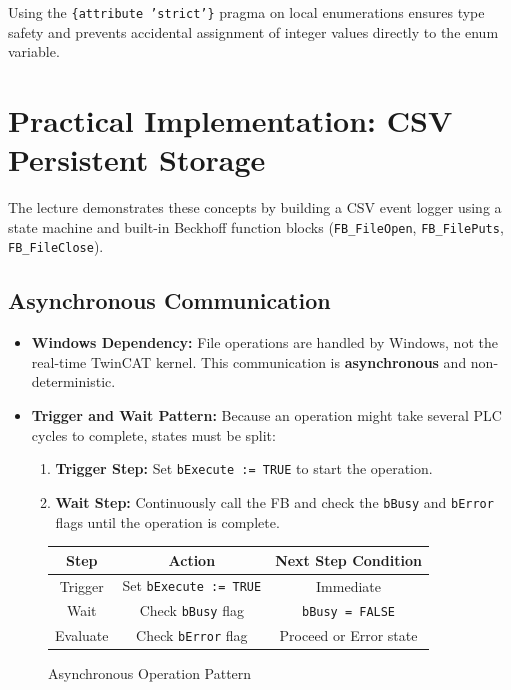 \documentclass[11pt,a4paper]{article}
\begin{document}
\begin{tipbox}
Using the \texttt{\{attribute 'strict'\}} pragma on local enumerations ensures type safety and prevents accidental assignment of integer values directly to the enum variable.
\end{tipbox}

\section{Practical Implementation: CSV Persistent Storage}

The lecture demonstrates these concepts by building a CSV event logger using a state machine and built-in Beckhoff function blocks (\texttt{FB\_FileOpen}, \texttt{FB\_FilePuts}, \texttt{FB\_FileClose}).

\subsection{Asynchronous Communication}

\begin{itemize}[leftmargin=*]
    \item \textbf{Windows Dependency:} File operations are handled by Windows, not the real-time TwinCAT kernel. This communication is \textbf{asynchronous} and non-deterministic.
    
    \item \textbf{Trigger and Wait Pattern:} Because an operation might take several PLC cycles to complete, states must be split:
    \begin{enumerate}
        \item \textbf{Trigger Step:} Set \texttt{bExecute := TRUE} to start the operation.
        \item \textbf{Wait Step:} Continuously call the FB and check the \texttt{bBusy} and \texttt{bError} flags until the operation is complete.
    \end{enumerate}
\end{itemize}

\begin{figure}[h]
\centering
\begin{tabular}{|c|c|c|}
\hline
\textbf{Step} & \textbf{Action} & \textbf{Next Step Condition} \\
\hline
Trigger & Set \texttt{bExecute := TRUE} & Immediate \\
\hline
Wait & Check \texttt{bBusy} flag & \texttt{bBusy = FALSE} \\
\hline
Evaluate & Check \texttt{bError} flag & Proceed or Error state \\
\hline
\end{tabular}
\caption{Asynchronous Operation Pattern}
\end{figure}
\end{document}
